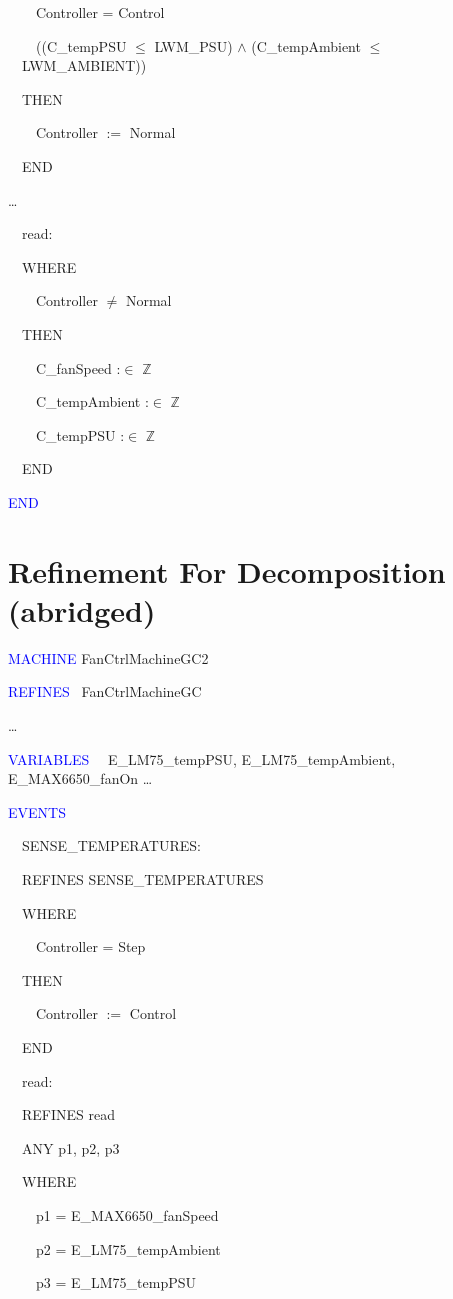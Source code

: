 \documentclass{llncs}%
\begin{document}
\ \ \ \ Controller = Control \ \ 

\ \ \ \ {\textlnot}((C\_tempPSU ${\leq}$ LWM\_PSU) ${\wedge}$
(C\_tempAmbient ${\leq}$ \ \ LWM\_AMBIENT))

\ \ THEN

\ \ \ \ Controller $:=$ Normal 

\ \ END

\ldots

\ \ read:\ \  \ 

\ \ WHERE

\ \ \ \ Controller ${\neq}$ Normal \ \ 

\ \ THEN

\ \ \ \  C\_fanSpeed :${\in}$ $\mathbb{Z}$ 

\ \ \ \ C\_tempAmbient :${\in}$ $\mathbb{Z}$ 

\ \ \ \ C\_tempPSU :${\in}$ $\mathbb{Z}$ 

\ \ END

\textcolor{blue}{END}
%
%
%
\section{Refinement For Decomposition (abridged)}\label{refi}
\textcolor{blue}{MACHINE} FanCtrlMachineGC2 \ \ 

\textcolor{blue}{REFINES} \ FanCtrlMachineGC 

{\dots} 

\textcolor{blue}{VARIABLES} \ \ E\_LM75\_tempPSU, E\_LM75\_tempAmbient, E\_MAX6650\_fanOn
{\dots} 

\textcolor{blue}{EVENTS}

\ \ SENSE\_TEMPERATURES:\ \  \ 

\ \ REFINES SENSE\_TEMPERATURES\ \  \

\ \ WHERE

\ \ \ \ Controller = Step \ \ 

\ \ THEN

\ \ \ \ Controller $:=$ Control 

\ \ END

\bigskip

\ \ read:\ \  

\ \ REFINES read 

\ \ ANY p1, p2, p3\ \  \ \ 

\ \ WHERE

\ \ \ \ p1 = E\_MAX6650\_fanSpeed \ \ 

\ \ \ \ p2 = E\_LM75\_tempAmbient \ \ 

\ \ \ \ p3 = E\_LM75\_tempPSU \ \ 
\end{document}
